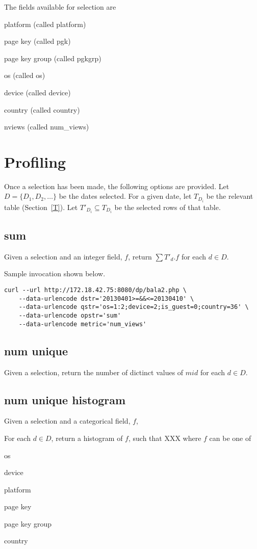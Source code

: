 The fields available for selection are 
\be
\item platform  (called platform)
\item page key  (called pgk)
\item page key group (called pgkgrp)
\item os (called os)
\item device (called device)
\item country (called country)
\item nviews (called num\_views)
\ee

\section{Profiling}
\label{Profiling}

Once a selection has been made, the following options are provided. Let
\(D = \{D_1, D_2,\ldots\}\) be the dates selected. For a given date, let
\(T_{D_i}\) be the relevant table (Section~\ref{T}). Let 
\(T'_{D_i} \subseteq T_{D_i}\) be the selected rows of that table.

\subsection{sum}
\label{profiling_sum}

Given a selection and an integer field, \(f\), 
return \(\sum T'_{d}.f\) for each \(d \in D\).

Sample invocation shown below.
\begin{verbatim}
curl --url http://172.18.42.75:8080/dp/bala2.php \
	--data-urlencode dstr='20130401>=&&<=20130410' \
	--data-urlencode qstr='os=1:2;device=2;is_guest=0;country=36' \
	--data-urlencode opstr='sum' 
	--data-urlencode metric='num_views' 
\end{verbatim}

\subsection{num unique}
\label{profiling_num_unique}

Given a selection, 
return the number of dictinct values of \(mid\) for each \(d \in D\).

\subsection{num unique histogram}

Given a selection and a categorical field, \(f\), 

For each \(d \in D\), return a histogram of \(f\), such that XXX where
\(f\) can be one of 
\be
\item os
\item device
\item platform
\item page key
\item page key group
\item country
\ee
